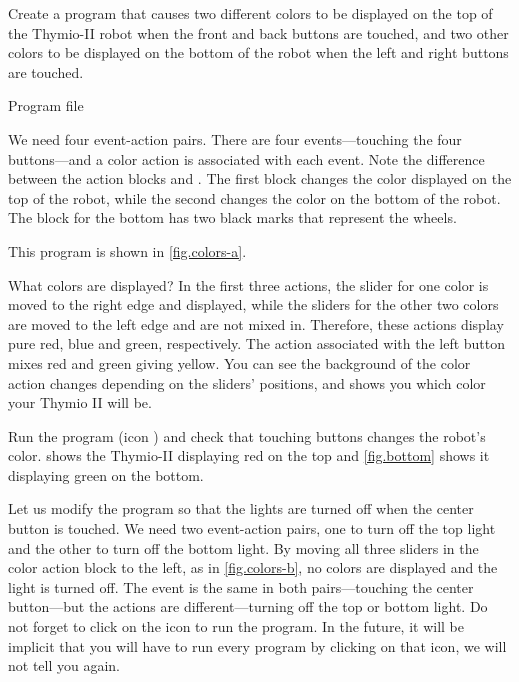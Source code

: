

Create a program that causes two different colors to be displayed on
the top of the Thymio-II robot when the front and back buttons are
touched, and two other colors to be displayed on the bottom of the robot
when the left and right buttons are touched.

{\raggedleft \hfill Program file }

We need four event-action pairs.
There are four events---touching the
four buttons---and a color action is associated with each event. Note the
difference between the action blocks  and
. The first block changes the color
displayed on the top of the robot, while the second changes the color on
the bottom of the robot. The block for the bottom has two black marks
that represent the wheels.

This program is shown in \cref{fig.colors-a}.

What colors are displayed? In the first three actions, the slider for
one color is moved to the right edge and displayed, while the sliders
for the other two colors are moved to the left edge and are not mixed
in. Therefore, these actions display pure red, blue and green,
respectively. The action associated with the left button mixes red and
green giving yellow.
You can see the background of the color action changes depending on the sliders' positions, and shows you which color your Thymio II will be.

Run the program (icon ) and check that touching buttons changes the robot's color.
 shows the Thymio-II displaying red on
the top and \cref{fig.bottom} shows it displaying green on the
bottom.



Let us modify the program so that the lights are turned off when the
center button is touched. We need two event-action pairs, one to turn
off the top light and the other to turn off the bottom light.
By moving all three sliders in the color action block to the left, as in \cref{fig.colors-b}, no colors are displayed and the light is turned off.
The event is the same in both pairs---touching the center button---but
the actions are different---turning off the top or bottom light. 
Do not forget to click on the icon  to run the program.
In the future, it will be implicit that you will have to run every program by clicking on that icon, we will not tell you again.

